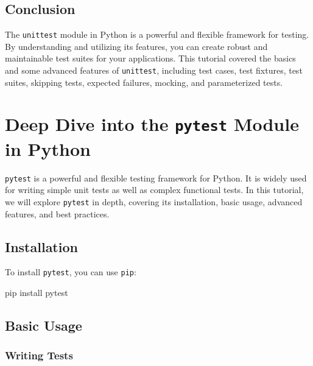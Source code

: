 \documentclass[
  letterpaper,
  DIV=11,
  numbers=noendperiod]{scrreprt}
\newenvironment{Shaded}{\begin{snugshade}}{\end{snugshade}}
\newcommand{\ExtensionTok}[1]{\textcolor[rgb]{0.00,0.23,0.31}{#1}}
\newcommand{\NormalTok}[1]{\textcolor[rgb]{0.00,0.23,0.31}{#1}}
\begin{document}
\section{Conclusion}\label{conclusion-31}

The \texttt{unittest} module in Python is a powerful and flexible
framework for testing. By understanding and utilizing its features, you
can create robust and maintainable test suites for your applications.
This tutorial covered the basics and some advanced features of
\texttt{unittest}, including test cases, test fixtures, test suites,
skipping tests, expected failures, mocking, and parameterized tests.


\chapter{\texorpdfstring{Deep Dive into the \texttt{pytest} Module in
Python}{Deep Dive into the pytest Module in Python}}\label{deep-dive-into-the-pytest-module-in-python}

\texttt{pytest} is a powerful and flexible testing framework for Python.
It is widely used for writing simple unit tests as well as complex
functional tests. In this tutorial, we will explore \texttt{pytest} in
depth, covering its installation, basic usage, advanced features, and
best practices.

\section{Installation}\label{installation}

To install \texttt{pytest}, you can use \texttt{pip}:

\begin{Shaded}
\begin{Highlighting}[]
\ExtensionTok{pip}\NormalTok{ install pytest}
\end{Highlighting}
\end{Shaded}

\section{Basic Usage}\label{basic-usage-2}

\subsection{Writing Tests}\label{writing-tests}
\end{document}
